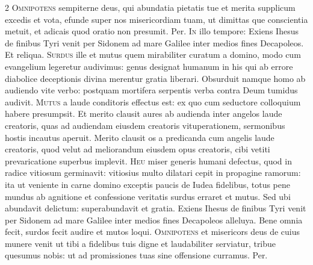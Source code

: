 \begin{multicols*}{2}
\lettrine[lines=2]{\zallmancaps \color{Blue} O}{mnipotens} sempiterne deus, qui abundatia pietatis tue et merita supplicum excedis et vota, efunde super nos misericordiam tuam, ut dimittas que conscientia metuit, et adicais quod oratio non presumit. Per.
\lettrine[lines=2]{\zallmancaps \color{Red} I}{n} illo tempore: Exiens Ihesus de finibus Tyri venit per Sidonem ad mare Galilee inter medios fines Decapoleos. Et reliqua.
\lettrine[lines=2]{\zallmancaps \color{Blue} S}{urdus} ille et mutus quem mirabiliter curatum a domino, modo cum evangelium legeretur audivimus: genus designat humanum in his qui ab errore diabolice deceptionis divina merentur gratia liberari. Obsurduit namque homo ab audiendo vite verbo: postquam mortifera serpentis verba contra Deum tumidus audivit.
\lettrine[lines=2]{\zallmancaps \color{Red} M}{utus} a laude conditoris effectus est: ex quo cum seductore colloquium habere presumpsit. Et merito clausit aures ab audienda inter angelos laude creatoris, quas ad audiendam eiusdem creatoris vituperationem, sermonibus hostis incautus aperuit. Merito clausit os a predicanda cum angelis laude creatoris, quod velut ad meliorandum eiusdem opus creatoris, cibi vetiti prevaricatione superbus implevit.
\lettrine[lines=2]{\zallmancaps \color{Blue} H}{eu} miser generis humani defectus, quod in radice vitiosum germinavit: vitiosius multo dilatari cepit in propagine ramorum: ita ut veniente in carne domino exceptis paucis de Iudea fidelibus, totus pene mundus ab agnitione et confessione veritatis surdus erraret et mutus. Sed ubi abundavit delictum: superabundavit et gratia.
 Exiens Ihesus de finibus Tyri venit per Sidonem ad mare Galilee inter medios fines Decapoleos alleluya.
 Bene omnia fecit, surdos fecit audire et mutos loqui.
\lettrine[lines=2]{\zallmancaps \color{Red} O}{mnipotens} et misericors deus de cuius munere venit ut tibi a fidelibus tuis digne et laudabiliter serviatur, tribue quesumus nobis: ut ad promissiones tuas sine offensione curramus. Per.

\end{multicols*}
